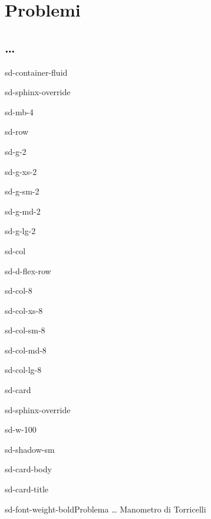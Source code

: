 \documentclass[letterpaper,10pt,italian]{jupyterBook}
\begin{document}
\sphinxstepscope


\section{Problemi}
\label{\detokenize{ch/thermodynamics/foundation-problems:problemi}}\label{\detokenize{ch/thermodynamics/foundation-problems:physics-hs-thermodynamics-foundation-problems}}\label{\detokenize{ch/thermodynamics/foundation-problems::doc}}

\subsection{ …}
\label{\detokenize{ch/thermodynamics/foundation-problems:todo}}


\begin{sphinxuseclass}{sd-container-fluid}
\begin{sphinxuseclass}{sd-sphinx-override}
\begin{sphinxuseclass}{sd-mb-4}
\begin{sphinxuseclass}{sd-row}
\begin{sphinxuseclass}{sd-g-2}
\begin{sphinxuseclass}{sd-g-xs-2}
\begin{sphinxuseclass}{sd-g-sm-2}
\begin{sphinxuseclass}{sd-g-md-2}
\begin{sphinxuseclass}{sd-g-lg-2}
\begin{sphinxuseclass}{sd-col}
\begin{sphinxuseclass}{sd-d-flex-row}
\begin{sphinxuseclass}{sd-col-8}
\begin{sphinxuseclass}{sd-col-xs-8}
\begin{sphinxuseclass}{sd-col-sm-8}
\begin{sphinxuseclass}{sd-col-md-8}
\begin{sphinxuseclass}{sd-col-lg-8}
\begin{sphinxuseclass}{sd-card}
\begin{sphinxuseclass}{sd-sphinx-override}
\begin{sphinxuseclass}{sd-w-100}
\begin{sphinxuseclass}{sd-shadow-sm}
\begin{sphinxuseclass}{sd-card-body}
\begin{sphinxuseclass}{sd-card-title}
\begin{sphinxuseclass}{sd-font-weight-bold}Problema … Manometro di Torricelli

\end{sphinxuseclass}
\end{sphinxuseclass}
\end{sphinxuseclass}
\end{sphinxuseclass}
\end{sphinxuseclass}
\end{sphinxuseclass}
\end{sphinxuseclass}
\end{sphinxuseclass}
\end{sphinxuseclass}
\end{sphinxuseclass}
\end{sphinxuseclass}
\end{sphinxuseclass}
\end{sphinxuseclass}
\end{sphinxuseclass}
\end{sphinxuseclass}
\end{sphinxuseclass}
\end{sphinxuseclass}
\end{sphinxuseclass}
\end{sphinxuseclass}
\end{sphinxuseclass}
\end{sphinxuseclass}
\end{sphinxuseclass}
\end{sphinxuseclass}
\end{document}
